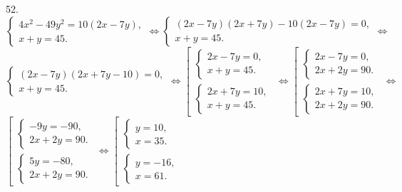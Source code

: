 52. $\begin{cases} 4x^2-49y^2=10(2x-7y),\\ x+y=45.\end{cases}\Leftrightarrow
\begin{cases} (2x-7y)(2x+7y)-10(2x-7y)=0,\\ x+y=45.\end{cases}\Leftrightarrow$\\$
\begin{cases} (2x-7y)(2x+7y-10)=0,\\ x+y=45.\end{cases}\Leftrightarrow
\left[\begin{array}{l}\begin{cases} 2x-7y=0,\\ x+y=45.\end{cases}\\
\begin{cases} 2x+7y=10,\\ x+y=45.\end{cases}\end{array}\right.\Leftrightarrow
\left[\begin{array}{l}\begin{cases} 2x-7y=0,\\ 2x+2y=90.\end{cases}\\
\begin{cases} 2x+7y=10,\\ 2x+2y=90.\end{cases}\end{array}\right.\Leftrightarrow$\\$
\left[\begin{array}{l}\begin{cases} -9y=-90,\\ 2x+2y=90.\end{cases}\\
\begin{cases} 5y=-80,\\ 2x+2y=90.\end{cases}\end{array}\right.
\Leftrightarrow
\left[\begin{array}{l}\begin{cases} y=10,\\ x=35.\end{cases}\\
\begin{cases} y=-16,\\ x=61.\end{cases}\end{array}\right.$\\
